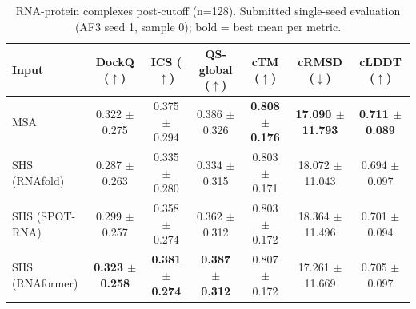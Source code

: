 \begin{table}[htbp]
\centering
\caption{RNA-protein complexes post-cutoff (n=128). Submitted single-seed evaluation (AF3 seed 1, sample 0); bold = best mean per metric.}
\label{tab:rna_protein_complexes_post_cutoff}
\begin{tabular}{lcccccc}
\toprule
Input & DockQ ($\uparrow$) & ICS ($\uparrow$) & QS-global ($\uparrow$) & cTM ($\uparrow$) & cRMSD ($\downarrow$) & cLDDT ($\uparrow$) \\
\midrule
MSA & 0.322 $\pm$ 0.275 & 0.375 $\pm$ 0.294 & 0.386 $\pm$ 0.326 & \textbf{0.808 $\pm$ 0.176} & \textbf{17.090 $\pm$ 11.793} & \textbf{0.711 $\pm$ 0.089} \\
SHS (RNAfold) & 0.287 $\pm$ 0.263 & 0.335 $\pm$ 0.280 & 0.334 $\pm$ 0.315 & 0.803 $\pm$ 0.171 & 18.072 $\pm$ 11.043 & 0.694 $\pm$ 0.097 \\
SHS (SPOT-RNA) & 0.299 $\pm$ 0.257 & 0.358 $\pm$ 0.274 & 0.362 $\pm$ 0.312 & 0.803 $\pm$ 0.172 & 18.364 $\pm$ 11.496 & 0.701 $\pm$ 0.094 \\
SHS (RNAformer) & \textbf{0.323 $\pm$ 0.258} & \textbf{0.381 $\pm$ 0.274} & \textbf{0.387 $\pm$ 0.312} & 0.807 $\pm$ 0.172 & 17.261 $\pm$ 11.669 & 0.705 $\pm$ 0.097 \\
\bottomrule
\end{tabular}
\end{table}
